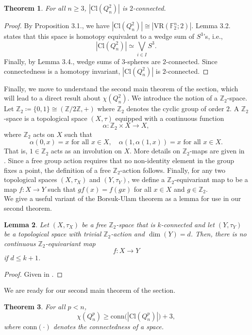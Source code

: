 \documentclass[12pt]{amsart}
\numberwithin{figure}{section}
\theoremstyle{plain}
\newtheorem{theorem}{Theorem}[section]
\newtheorem{lemma}[theorem]{Lemma}
\begin{document}
\begin{theorem}
    For all $n\geq 3$, $|\mathrm{Cl}(Q_{n}^{2})|$ is $2$-connected.
\end{theorem}
\begin{proof}
    By Proposition 3.1., we have $|\mathrm{Cl}(Q_{n}^{2})| \cong |\mathrm{VR}(\mathbb{F}_{2}^{n}; 2)|$. Lemma 3.2. states that this space is homotopy equivalent to a wedge sum of $S^{3}$'s, i.e.,
    \[|\mathrm{Cl}(Q_{n}^{2})| \simeq \bigvee_{i\in I} S^{3}.\]
    Finally, by Lemma 3.4., wedge sums of $3$-spheres are $2$-connected. Since connectedness is a homotopy invariant, $|\mathrm{Cl}(Q_{n}^{2})|$ is $2$-connected.
\end{proof}
\indent Finally, we move to understand the second main theorem of the section, which will lead to a direct result about $\chi(Q_{n}^{2})$. We introduce the notion of a $\mathbb{Z}_{2}$-space.\\
\indent Let $\mathbb{Z}_{2} \coloneq \{0,1\}\cong(\mathbb{Z}/2\mathbb{Z}, +)$ where $\mathbb{Z}_{2}$ denotes the cyclic group of order $2$. A $\mathbb{Z}_{2}$-space is a topological space $(X, \tau)$ equipped with a continuous function 
\[\alpha: \mathbb{Z}_{2}\times X \to X,\]
where $\mathbb{Z}_{2}$ acts on $X$ such that
\[\alpha(0, x) = x \text{ for all }x\in X,\quad \alpha(1, \alpha(1,x)) = x \text{ for all }x\in X.\]
That is, $1\in\mathbb{Z}_{2}$ acts as an involution on $X$. More details on $\mathbb{Z}_{2}$-maps are given in \cite{Kozlov08}. Since a free group action requires that no non-identity element in the group fixes a point, the definition of a free $\mathbb{Z}_{2}$-action follows. Finally, for any two topological spaces $(X, \tau_{X})$ and $(Y, \tau_{Y})$, we define a $\mathbb{Z}_{2}$-equivariant map to be a map $f:X\to Y$ such that $gf(x) = f(gx)$ for all $x\in X$ and $g\in \mathbb{Z}_{2}$.\\
\indent We give a useful variant of the Borsuk-Ulam theorem as a lemma for use in our second theorem.
\begin{lemma}
    Let $(X, \tau_{X})$ be a free $\mathbb{Z}_{2}$-space that is $k$-connected and let $(Y, \tau_{Y})$ be a topological space with trivial $\mathbb{Z}_{2}$-action and $\dim(Y) = d$. Then, there is no continuous $\mathbb{Z}_{2}$-equivariant map
    \[f : X \to Y\]
    if $d \leq k + 1$.
\end{lemma}
\begin{proof}
    Given in \cite{Borsuk1933}.
\end{proof}
\indent We are ready for our second main theorem of the section.
\begin{theorem}
    For all $p < n$,
    \[\chi(Q_{n}^{p}) \geq \mathrm{conn}\bigl(|\mathrm{Cl}(Q_{n}^{p})|\bigr) + 3,\]
    where $\mathrm{conn}(\cdot)$ denotes the connectedness of a space.
\end{theorem}
\end{document}
